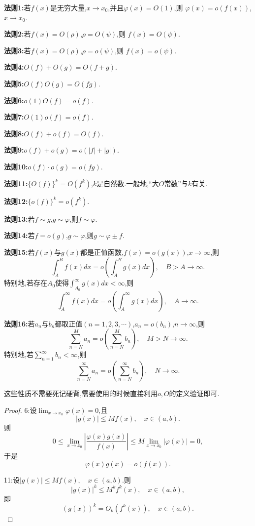 \documentclass[lang=cn,newtx,10pt,scheme=chinese]{elegantbook}
\begin{document}
\begin{theorem}[$O$与$o$的基本运算法则]\label{$O$与$o$的基本运算法则}
    \textbf{法则1:}若\(f(x)\)是无穷大量,\(x\to x_0\),并且\(\varphi(x)=O(1)\),则
\(\varphi(x)=o(f(x))\),\(x\to x_0\).

\textbf{法则2:}若\(f(x)=O(\rho)\),\(\rho = O(\psi)\),则
\(f(x)=O(\psi)\).

\textbf{法则3:}若\(f(x)=O(\rho)\),\(\rho = o(\psi)\),则
\(f(x)=o(\psi)\).

\textbf{法则4:}\(O(f)+O(g)=O(f + g)\).

\textbf{法则5:}\(O(f)O(g)=O(fg)\).

\textbf{法则6:}\(o(1)O(f)=o(f)\).

\textbf{法则7:}\(O(1)o(f)=o(f)\).

\textbf{法则8:}\(O(f)+o(f)=O(f)\).

\textbf{法则9:}\(o(f)+o(g)=o(|f|+|g|)\).

\textbf{法则10:}\(o(f)\cdot o(g)=o(fg)\).

\textbf{法则11:}\(\{O(f)\}^k = O(f^k)\),\(k\)是自然数.一般地,“大\(O\)常数”与\(k\)有关.

\textbf{法则12:}\(\{o(f)\}^k = o(f^k)\).

\textbf{法则13:}若\(f\sim g\),\(g\sim\varphi\),则\(f\sim\varphi\).

\textbf{法则14:}若\(f = o(g)\),\(g\sim\varphi\),则\(g\sim\varphi\pm f\).

\textbf{法则15:}若\(f(x)\)与\(g(x)\)都是正值函数,\(f(x)=o(g(x))\),\(x\to\infty\),则
\[
\int_{A}^{B}f(x)dx = o\left(\int_{A}^{B}g(x)dx\right),\quad B > A\to\infty.
\]
特别地,若存在\(A_0\)使得\(\int_{A_0}^{\infty}g(x)dx<\infty\),则
\[
\int_{A}^{\infty}f(x)dx = o\left(\int_{A}^{\infty}g(x)dx\right),\quad A\to\infty.
\]

\textbf{法则16:}若\(a_n\)与\(b_n\)都取正值\((n = 1,2,3,\cdots)\),\(a_n=o(b_n)\),\(n\to\infty\),则
\[
\sum_{n = N}^{M}a_n = o\left(\sum_{n = N}^{M}b_n\right),\quad M > N\to\infty.
\]
特别地,若\(\sum_{n = 1}^{\infty}b_n<\infty\),则
\[
\sum_{n = N}^{\infty}a_n = o\left(\sum_{n = N}^{\infty}b_n\right),\quad N\to\infty.
\]
\end{theorem}
\begin{note}
这些性质不需要死记硬背,需要使用的时候直接利用$o,O$的定义验证即可.
\end{note}
\begin{proof}
    {\color[RGB]{128, 128, 0} 6:}设\(\lim_{x\to x_0}\varphi(x) = 0\),且
\[
|g(x)|\leq Mf(x),\quad x\in(a,b).
\]
则
\[
0\leq\lim_{x\to x_0}\left|\frac{\varphi(x)g(x)}{f(x)}\right|\leq M\lim_{x\to x_0}|\varphi(x)| = 0,
\]
于是
\[
\varphi(x)g(x)=o(f(x)).
\]

{\color[RGB]{128, 128, 0} 11:}设\(|g(x)|\leq Mf(x),\quad x\in(a,b)\).则
\[
|g(x)|^k\leq M^k f^k(x),\quad x\in(a,b),
\]
即
\[
(g(x))^k = O_k(f^k(x)),\quad x\in(a,b).
\]
\end{proof}
\end{document}
